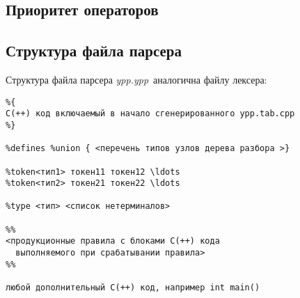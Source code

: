 \documentclass[oneside,10pt]{article}
\newcommand{\file}[1]{\textit{#1}}
\begin{document}
\clearpage
\subsection{Приоритет операторов}

\subsection{Структура файла парсера}

Структура файла парсера \file{ypp.ypp}\ аналогична файлу лексера: 

\begin{verbatim}
%{
С(++) код включаемый в начало сгенерированного ypp.tab.cpp
%}

%defines %union { <перечень типов узлов дерева разбора >}

%token<тип1> токен11 токен12 \ldots
%token<тип2> токен21 токен22 \ldots

%type <тип> <список нетерминалов>

%%
<продукционные правила c блоками С(++) кода
  выполняемого при срабатывании правила>
%%

любой дополнительный С(++) код, например int main()
\end{verbatim}
\end{document}
